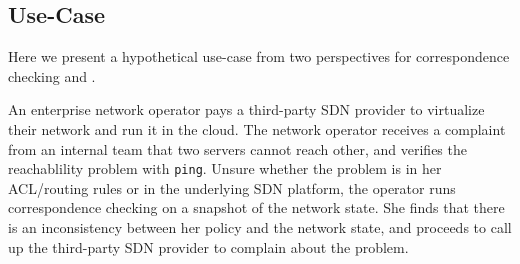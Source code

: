 \subsection{Use-Case}

Here we present a hypothetical use-case from two perspectives
for correspondence checking and \simulator{}.

 An enterprise network
operator pays a third-party SDN provider to virtualize their network
and run it in the cloud. The network operator receives a complaint
from an internal team that two servers cannot reach other, and 
verifies the reachablility problem with {\tt ping}. Unsure
whether the problem is in her ACL/routing rules 
or in the underlying SDN platform, the
operator runs correspondence checking on a snapshot of the network state. She
finds that there is an inconsistency between her policy and the network state, 
and proceeds to call up the third-party SDN provider to complain
about the problem.

